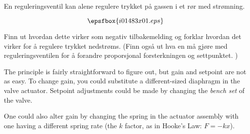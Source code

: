 


En reguleringsventil kan alene regulere trykket p{\aa} gassen i et r{\o}r med str{\o}mning. 

$$\epsfbox{i01483x01.eps}$$


Finn ut hvordan dette virker som negativ tilbakemelding og forklar hvordan det virker for {\aa} regulere trykket nedstr{\o}ms. (Finn ogs{\aa} ut hva en m{\aa} gj{\o}re med reguleringsventilen for {\aa} forandre proporsjonal forsterkningen og settpunktet. )







The principle is fairly straightforward to figure out, but gain and setpoint are not as easy.  To change gain, you could substitute a different-sized diaphragm in the valve actuator.  Setpoint adjustments could be made by changing the {\it bench set} of the valve.







One could also alter gain by changing the spring in the actuator assembly with one having a different spring rate (the $k$ factor, as in Hooke's Law: $F = -kx$).





